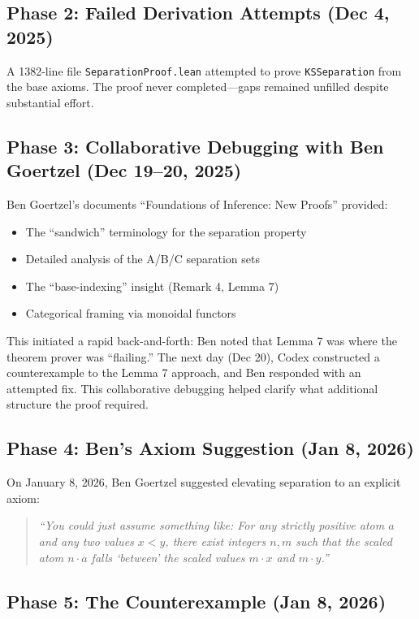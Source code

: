 \documentclass[11pt]{article}
\theoremstyle{definition}
\theoremstyle{remark}
\begin{document}
\subsection*{Phase 2: Failed Derivation Attempts (Dec 4, 2025)}

A 1382-line file \texttt{SeparationProof.lean} attempted to prove \texttt{KSSeparation} from
the base axioms. The proof never completed---gaps remained unfilled despite substantial effort.

\subsection*{Phase 3: Collaborative Debugging with Ben Goertzel (Dec 19--20, 2025)}

Ben Goertzel's documents ``Foundations of Inference: New Proofs'' provided:
\begin{itemize}
\item The ``sandwich'' terminology for the separation property
\item Detailed analysis of the A/B/C separation sets
\item The ``base-indexing'' insight (Remark 4, Lemma 7)
\item Categorical framing via monoidal functors
\end{itemize}

This initiated a rapid back-and-forth: Ben noted that Lemma 7 was where the theorem prover
was ``flailing.'' The next day (Dec 20), Codex constructed a counterexample to the Lemma 7
approach, and Ben responded with an attempted fix. This collaborative debugging helped
clarify what additional structure the proof required.

\subsection*{Phase 4: Ben's Axiom Suggestion (Jan 8, 2026)}

On January 8, 2026, Ben Goertzel suggested elevating separation to an explicit axiom:
\begin{quote}
\emph{``You could just assume something like: For any strictly positive atom $a$ and any two
values $x < y$, there exist integers $n, m$ such that the scaled atom $n \cdot a$ falls
`between' the scaled values $m \cdot x$ and $m \cdot y$.''}
\end{quote}

\subsection*{Phase 5: The Counterexample (Jan 8, 2026)}
\end{document}
